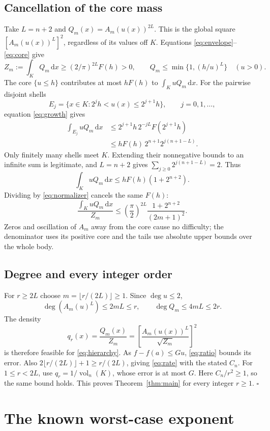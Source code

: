 \documentclass[11pt]{article}
\newcommand{\vol}{\operatorname{vol}_n}
\newcommand{\dd}{\,\mathrm{d}}
\begin{document}
\subsection*{Cancellation of the core mass}
Take $L=n+2$ and $Q_m(x)=A_m(u(x))^{2L}$.
This is the global square $[A_m(u(x))^L]^2$, regardless of its values
off $K$. Equations \eqref{eq:envelope}--\eqref{eq:core} give
\begin{equation}\label{eq:normalizer}
 Z_m:=\int_KQ_m\dd x\ge(2/\pi)^{2L}F(h)>0,
 \qquad Q_m\le\min\{1,(h/u)^L\}\quad(u>0).
\end{equation}
The core $\{u\le h\}$ contributes at most $hF(h)$ to
$\int_KuQ_m\dd x$. For the pairwise disjoint shells
\[
 E_j=\{x\in K:2^jh<u(x)\le2^{j+1}h\},\qquad j=0,1,\ldots,
\]
equation \eqref{eq:growth} gives
\begin{align*}
 \int_{E_j}uQ_m\dd x
 &\le 2^{j+1}h\,2^{-jL}F(2^{j+1}h)\\
 &\le hF(h)\,2^{n+1}2^{j(n+1-L)}.
\end{align*}
Only finitely many shells meet $K$. Extending their nonnegative
bounds to an infinite sum is legitimate, and $L=n+2$ gives
$\sum_{j\ge0}2^{j(n+1-L)}=2$. Thus
\[
 \int_KuQ_m\dd x\le hF(h)(1+2^{n+2}).
\]
Dividing by \eqref{eq:normalizer} cancels the same $F(h)$:
\begin{equation}\label{eq:ratio}
 \frac{\int_KuQ_m\dd x}{Z_m}
 \le \left(\frac\pi2\right)^{2L}
       \frac{1+2^{n+2}}{(2m+1)^2}.
\end{equation}
Zeros and oscillation of $A_m$ away from the core cause no difficulty;
the denominator uses its positive core and the tails use absolute
upper bounds over the whole body.

\subsection*{Degree and every integer order}
For $r\ge2L$ choose $m=\lfloor r/(2L)\rfloor\ge1$.
Since $\deg u\le2$,
\[
 \deg(A_m(u)^L)\le2mL\le r,\qquad \deg Q_m\le4mL\le2r.
\]
The density
\[
 q_r(x)=\frac{Q_m(x)}{Z_m}
       =\left[\frac{A_m(u(x))^L}{\sqrt{Z_m}}\right]^2
\]
is therefore feasible for \eqref{eq:hierarchy}. As $f-f(a)\le Gu$,
\eqref{eq:ratio} bounds its error. Also
$2\lfloor r/(2L)\rfloor+1\ge r/(2L)$, giving
\eqref{eq:rate} with the stated $C_n$.
For $1\le r<2L$, use $q_r=1/\vol(K)$, whose error is at most $G$.
Here $C_n/r^2\ge1$, so the same bound holds.
This proves Theorem~\ref{thm:main} for every integer $r\ge1$.
\hfill$\square$

\section{The known worst-case exponent}
\end{document}
